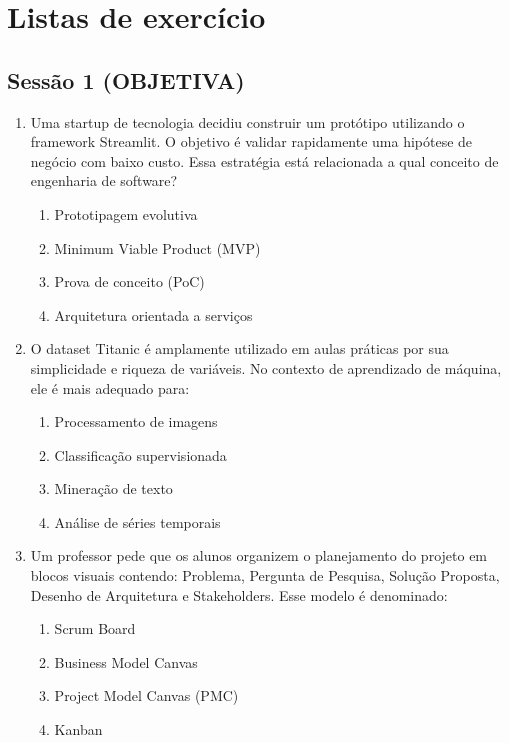 \documentclass[12pt,a4paper]{article}
\begin{document}
\clearpage
\section*{Listas de exercício}
\subsection*{Sessão 1 (OBJETIVA)}

\begin{enumerate}

\item Uma startup de tecnologia decidiu construir um protótipo utilizando o framework Streamlit. O objetivo é validar rapidamente uma hipótese de negócio com baixo custo. Essa estratégia está relacionada a qual conceito de engenharia de software?
\begin{enumerate}[label=\alph*)]
\item Prototipagem evolutiva
\item Minimum Viable Product (MVP)
\item Prova de conceito (PoC)
\item Arquitetura orientada a serviços
\end{enumerate}

\item O dataset Titanic é amplamente utilizado em aulas práticas por sua simplicidade e riqueza de variáveis. No contexto de aprendizado de máquina, ele é mais adequado para:
\begin{enumerate}[label=\alph*)]
\item Processamento de imagens
\item Classificação supervisionada
\item Mineração de texto
\item Análise de séries temporais
\end{enumerate}

\item Um professor pede que os alunos organizem o planejamento do projeto em blocos visuais contendo: Problema, Pergunta de Pesquisa, Solução Proposta, Desenho de Arquitetura e Stakeholders. Esse modelo é denominado:
\begin{enumerate}[label=\alph*)]
\item Scrum Board
\item Business Model Canvas
\item Project Model Canvas (PMC)
\item Kanban
\end{enumerate}


\end{enumerate}
\end{document}

